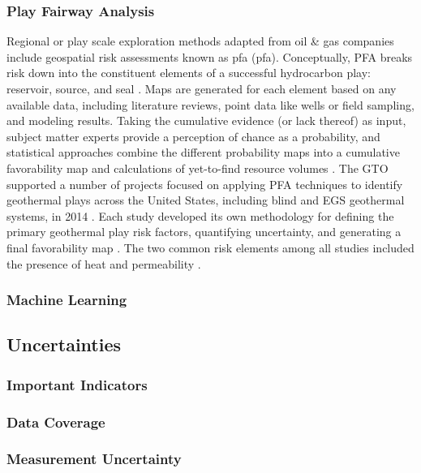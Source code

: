 \subsubsection{Play Fairway Analysis}
Regional or play scale exploration methods adapted from oil \& gas companies include geospatial risk assessments known as \acrlong{pfa} (\acrshort{pfa}).  Conceptually, PFA breaks risk down into the constituent elements of a successful hydrocarbon play: reservoir, source, and seal \citep{fraser_regional_2010,nash_adaptation_2015}. Maps are generated for each element based on any available data, including literature reviews, point data like wells or field sampling, and modeling results. Taking the cumulative evidence (or lack thereof) as input, subject matter experts provide a perception of chance as a probability, and statistical approaches combine the different probability maps into a cumulative favorability map and calculations of yet-to-find resource volumes \citep{lottaroli_evaluating_2018}. The GTO supported a number of projects focused on applying PFA techniques to identify geothermal plays across the United States, including blind and EGS geothermal systems, in 2014 \citep{eeri_play_2014}. Each study developed its own methodology for defining the primary geothermal play risk factors, quantifying uncertainty, and generating a final favorability map \citep{faulds_discovering_2019, jordan_low_2016, nash_phase_2017, wannamaker_structurally_2016}. The two common risk elements among all studies included the presence of heat and permeability \citep{garchar_geothermal_2016}.

\subsubsection{Machine Learning}

\subsection{Uncertainties}
\subsubsection{Important Indicators}
\subsubsection{Data Coverage}
\subsubsection{Measurement Uncertainty}
